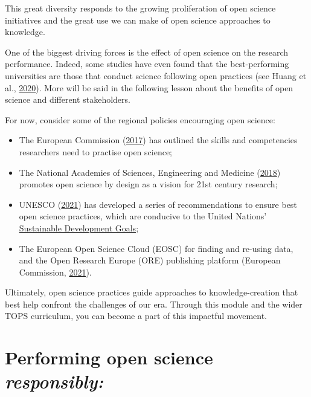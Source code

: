 \documentclass[
  letterpaper,
  DIV=11,
  numbers=noendperiod]{scrreport}
\providecommand{\tightlist}{%
  \setlength{\itemsep}{0pt}\setlength{\parskip}{0pt}}\usepackage{longtable,booktabs,array}
\begin{document}
This great diversity responds to the growing proliferation of open
science initiatives and the great use we can make of open science
approaches to knowledge.

One of the biggest driving forces is the effect of open science on the
research performance. Indeed, some studies have even found that the
best-performing universities are those that conduct science following
open practices (see Huang et al.,
\href{https://doi.org/10.7554/eLife.57067}{2020}). More will be said in
the following lesson about the benefits of open science and different
stakeholders.

For now, consider some of the regional policies encouraging open
science:

\begin{itemize}
\tightlist
\item
  The European Commission
  (\href{https://data.europa.eu/doi/10.2777/121253}{2017}) has outlined
  the skills and competencies researchers need to practise open science;
\item
  The National Academies of Sciences, Engineering and Medicine
  (\href{https://doi.org/10.17226/25116}{2018}) promotes open science by
  design as a vision for 21st century research;
\item
  UNESCO
  (\href{https://unesdoc.unesco.org/ark:/48223/pf0000379949.locale=en}{2021})
  has developed a series of recommendations to ensure best open science
  practices, which are conducive to the United Nations'
  \href{https://sdgs.un.org/goals}{Sustainable Development Goals};
\item
  The European Open Science Cloud (EOSC) for finding and re-using data,
  and the Open Research Europe (ORE) publishing platform (European
  Commission, \href{https://data.europa.eu/doi/10.2777/18252}{2021}).
\end{itemize}

Ultimately, open science practices guide approaches to
knowledge-creation that best help confront the challenges of our era.
Through this module and the wider TOPS curriculum, you can become a part
of this impactful movement.

\hypertarget{performing-open-science-responsibly}{%
\section*{\texorpdfstring{Performing open science
\emph{responsibly:}}{Performing open science responsibly:}}\label{performing-open-science-responsibly}}
\end{document}
